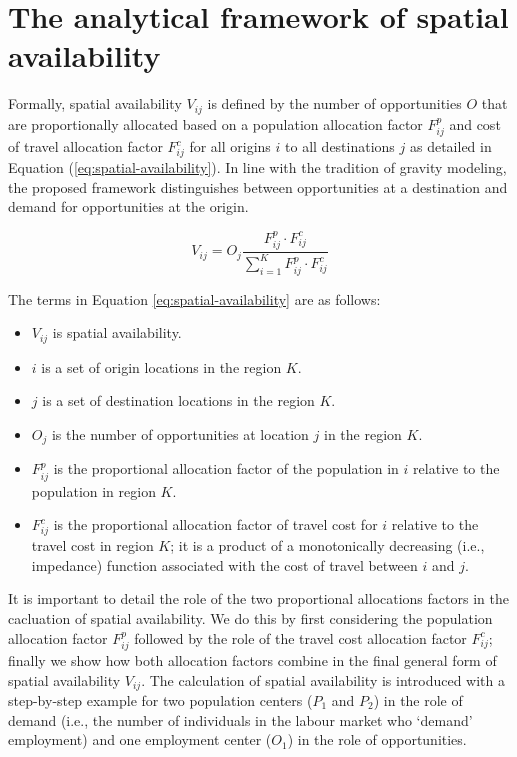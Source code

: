 \documentclass[]{elsarticle} %
\providecommand{\tightlist}{%
  \setlength{\itemsep}{0pt}\setlength{\parskip}{0pt}}
\begin{document}
\hypertarget{spatial-availability-framework}{%
\section{The analytical framework of spatial
availability}\label{spatial-availability-framework}}

Formally, spatial availability \(V_{ij}\) is defined by the number of
opportunities \(O\) that are proportionally allocated based on a
population allocation factor \(F^p_{ij}\) and cost of travel allocation
factor \(F^c_{ij}\) for all origins \(i\) to all destinations \(j\) as
detailed in Equation (\ref{eq:spatial-availability}). In line with the
tradition of gravity modeling, the proposed framework distinguishes
between opportunities at a destination and demand for opportunities at
the origin.

\begin{equation}
\label{eq:spatial-availability}
V_{ij} = O_j\frac{F^p_{ij} \cdot F^c_{ij}}{\sum_{i=1}^K F^p_{ij} \cdot F^c_{ij}}
\end{equation}

The terms in Equation \ref{eq:spatial-availability} are as follows:

\begin{itemize}
\tightlist
\item
  \(V_{ij}\) is spatial availability.
\item
  \(i\) is a set of origin locations in the region \(K\).
\item
  \(j\) is a set of destination locations in the region \(K\).
\item
  \(O_j\) is the number of opportunities at location \(j\) in the region
  \(K\).
\item
  \(F^p_{ij}\) is the proportional allocation factor of the population
  in \(i\) relative to the population in region \(K\).
\item
  \(F^c_{ij}\) is the proportional allocation factor of travel cost for
  \(i\) relative to the travel cost in region \(K\); it is a product of
  a monotonically decreasing (i.e., impedance) function associated with
  the cost of travel between \(i\) and \(j\).
\end{itemize}

It is important to detail the role of the two proportional allocations
factors in the cacluation of spatial availability. We do this by first
considering the population allocation factor \(F^p_{ij}\) followed by
the role of the travel cost allocation factor \(F^c_{ij}\); finally we
show how both allocation factors combine in the final general form of
spatial availability \(V_{ij}\). The calculation of spatial availability
is introduced with a step-by-step example for two population centers
(\(P_1\) and \(P_2\)) in the role of demand (i.e., the number of
individuals in the labour market who `demand' employment) and one
employment center (\(O_1\)) in the role of opportunities.
\end{document}
